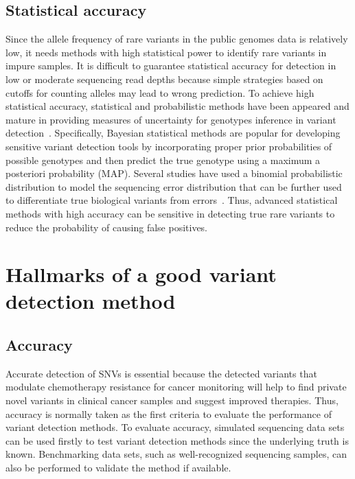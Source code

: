 \documentclass[a4,center,fleqn]{NAR}
\begin{document}
\subsection{Statistical accuracy}

Since the allele frequency of rare variants in the public genomes data is relatively low, it needs methods with high statistical power to identify rare variants in impure samples. 
It is difficult to guarantee statistical accuracy for detection in low or moderate sequencing read depths because simple strategies based on cutoffs for counting alleles may lead to wrong prediction.
To achieve high statistical accuracy, statistical and probabilistic methods have been appeared and mature in providing measures of uncertainty for genotypes inference in variant detection~\citep{Nielsen2011}.  
Specifically, Bayesian statistical methods are popular for developing sensitive variant detection tools by incorporating proper prior probabilities of possible genotypes and then predict the true genotype using a maximum a posteriori probability (MAP).
Several studies have used a binomial probabilistic distribution to model the sequencing error distribution that can be further used to differentiate true biological variants from errors~\citep{Flaherty2012, Shiraishi2013, gerstung2012reliable, Christoforides2013}.
Thus, advanced statistical methods with high accuracy can be sensitive in detecting true rare variants to reduce the probability of causing false positives.

\section{Hallmarks of a good variant detection method}

\subsection{Accuracy}
Accurate detection of SNVs is essential because the detected variants that modulate chemotherapy resistance for cancer monitoring will help to find private novel variants in clinical cancer samples and suggest improved therapies.
Thus, accuracy is normally taken as the first criteria to evaluate the performance of variant detection methods.
To evaluate accuracy, simulated sequencing data sets can be used firstly to test variant detection methods since the underlying truth is known.
Benchmarking data sets, such as well-recognized sequencing samples, can also be performed to validate the method if available.
\end{document}
